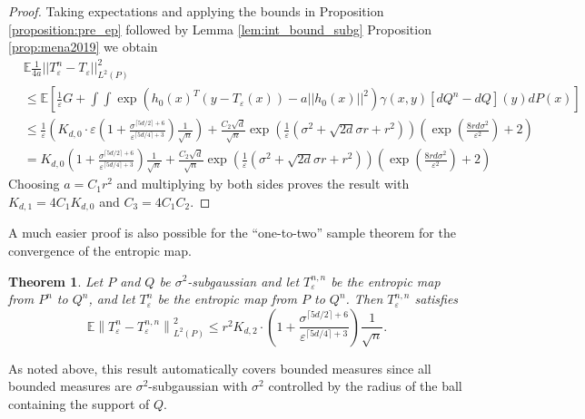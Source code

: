 \documentclass{article}
\newtheorem{theorem}{Theorem}
\theoremstyle{definition}
\newcommand{\Teps}{T_\varepsilon}
\newcommand{\norm}[1]{\left\lVert#1\right\rVert}
\begin{document}
\begin{proof}
    Taking expectations and applying the bounds in Proposition \ref{proposition:pre_ep} followed by Lemma \ref{lem:int_bound_subg} Proposition \ref{prop:mena2019} we obtain
    \begin{align*}
        &\mathbb{E} \frac{1}{4a}||\Teps^n - \Teps||_{L^2(P)}^2 \\
        &\leq\mathbb{E} \left [ \frac{1}{\varepsilon}G + \int\int \exp\left (h_0(x)^T(y - \Teps(x)) - a||h_0(x)||^2 \right )\gamma(x,y) [dQ^n - dQ](y)dP(x) \right ] \\
        &\leq \frac{1}{\varepsilon} \left (  K_{d,0} \cdot \varepsilon \left ( 1 + \frac{\sigma^{\lceil 5d / 2 \rceil + 6}}{\varepsilon^{\lceil 5d/4 \rceil + 3}} \right )\frac{1}{\sqrt{n}} \right ) +  \frac{C_2\sqrt{d}}{\sqrt{n}} 
        \exp \left (
            \frac{1}{\varepsilon} \left (  
                \sigma^2 + \sqrt{2 d} \sigma r + r^2
            \right ) 
        \right ) 
        \left ( 
            \exp \left (
                \frac{8rd\sigma^2}{\varepsilon^2}
            \right ) 
            + 2 
        \right ) \\
        &=
          K_{d,0}  \left ( 1 + \frac{\sigma^{\lceil 5d / 2 \rceil + 6}}{\varepsilon^{\lceil 5d/4 \rceil + 3}} \right )\frac{1}{\sqrt{n}} +  \frac{C_2\sqrt{d}}{\sqrt{n}} 
        \exp \left (
            \frac{1}{\varepsilon} \left (  
                \sigma^2 + \sqrt{2 d} \sigma r + r^2
            \right ) 
        \right ) 
        \left ( 
            \exp \left (
                \frac{8rd\sigma^2}{\varepsilon^2}
            \right ) 
            + 2 
        \right ) 
    \end{align*}
    Choosing $a = C_1r^2$ and multiplying by both sides proves the result with $K_{d,1} = 4C_1K_{d,0}$ and $C_3 = 4C_1C_2$.
\end{proof}

A much easier proof is also possible for the ``one-to-two'' sample theorem for the convergence of the entropic map.
\begin{theorem} \label{thm:1_to_2_subg}Let $P$ and $Q$ be $\sigma^2$-subgaussian and 
    let $\Teps^{n,n}$ be the entropic map from $P^n$ to $Q^n$, and let $\Teps^n$ be the entropic map from $P$ to $Q^n$. Then $\Teps^{n,n}$ satisfies
    \begin{equation*}
        \mathbb{E}\norm{\Teps^n - \Teps^{n,n}}_{L^2(P)}^2 \leq r^2  K_{d,2} \cdot \left ( 1 + \frac{\sigma^{\lceil 5d/2\rceil + 6}}{\varepsilon^{\lceil 5d / 4 \rceil + 3}}\right ) \frac{1}{\sqrt{n}}.
    \end{equation*}
\end{theorem}
As noted above, this result automatically covers bounded measures since all bounded measures are $\sigma^2$-subgaussian with $\sigma^2$ controlled by the radius of the ball containing the support of $Q$. 
\end{document}
